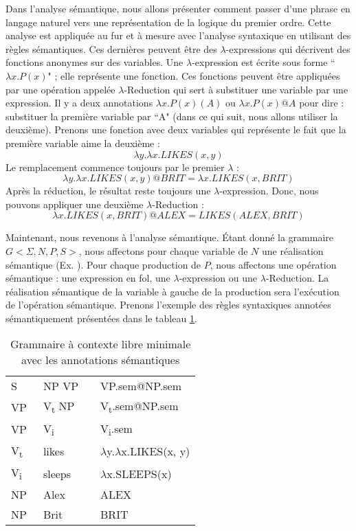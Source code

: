 \documentclass{KodeBook}
\begin{document}
Dans l'analyse sémantique, nous allons présenter comment passer d'une phrase en langage naturel vers une représentation de la logique du premier ordre. 
Cette analyse est appliquée au fur et à mesure avec l'analyse syntaxique en utilisant des règles sémantiques. 
Ces dernières peuvent être des $\lambda $-expressions qui décrivent des fonctions anonymes sur des variables. 
Une $\lambda $-expression est écrite sous forme ``$ \lambda x.P(x)$" ; elle représente une fonction. 
Ces fonctions peuvent être appliquées par une opération appelée $\lambda $-Reduction qui sert à substituer une variable par une expression. 
Il y a deux annotations $ \lambda x.P(x)(A)$ ou $ \lambda x.P(x)@A$ pour dire : substituer la première variable par ``A" (dans ce qui suit, nous allons utiliser la deuxième). 
Prenons une fonction avec deux variables qui représente le fait que la première variable aime la deuxième : 
\[\lambda y.\lambda x.LIKES(x, y)\]
Le remplacement commence toujours par le premier $\lambda$ :
\[\lambda y.\lambda x.LIKES(x, y)@BRIT = \lambda x.LIKES(x, BRIT)\] 
Après la réduction, le résultat reste toujours une $\lambda $-expression. 
Donc, nous pouvons appliquer une deuxième $\lambda $-Reduction :
\[\lambda x.LIKES(x, BRIT)@ALEX = LIKES(ALEX, BRIT)\]

Maintenant, nous revenons à l'analyse sémantique. 
Étant donné la grammaire $G <\Sigma, N, P, S>$, nous affectons pour chaque variable de $N$ une réalisation sémantique (Ex. ). 
Pour chaque production de $P$, nous affectons une opération sémantique : une expression en \ac{fol}, une $\lambda $-expression ou une $\lambda $-Reduction.
La réalisation sémantique  de la variable à gauche de la production sera l'exécution de l'opération sémantique.
Prenons l'exemple des règles syntaxiques annotées sémantiquement présentées dans le tableau \ref{tab:regles-sem1}.

\begin{table}[ht]
	\centering
	\begin{tabular}{llll}
		\hline\hline
		S  & \textrightarrow\ NP VP && VP.sem@NP.sem \\
		VP & \textrightarrow\ V\textsubscript{t} NP && V\textsubscript{t}.sem@NP.sem\\
		VP & \textrightarrow\ V\textsubscript{i} && V\textsubscript{i}.sem \\
		V\textsubscript{t}  & \textrightarrow\ likes && $ \lambda $y.$ \lambda $x.LIKES(x, y) \\
		V\textsubscript{i}  & \textrightarrow\ sleeps && $ \lambda $x.SLEEPS(x) \\
		NP  & \textrightarrow\  Alex && ALEX \\
		NP  & \textrightarrow\  Brit && BRIT \\
		\hline\hline
	\end{tabular}
	\caption{Grammaire à contexte libre minimale avec les annotations sémantiques}
	\label{tab:regles-sem1}
\end{table}
\end{document}
